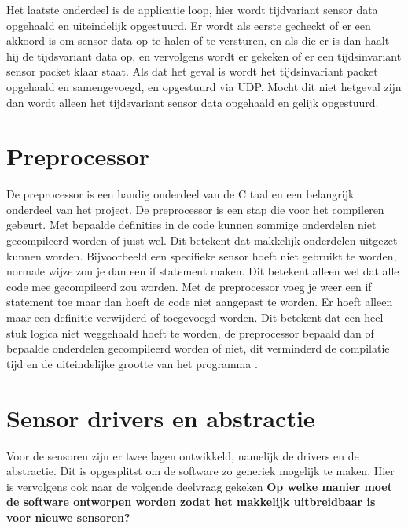 \noindent Het laatste onderdeel is de applicatie loop, hier wordt tijdvariant sensor data opgehaald en uiteindelijk opgestuurd. Er wordt als eerste gecheckt of er een akkoord is om sensor data op te halen of te versturen, en als die er is dan haalt hij de tijdsvariant data op, en vervolgens wordt er gekeken of er een tijdsinvariant sensor packet klaar staat. Als dat het geval is wordt het tijdsinvariant packet opgehaald en samengevoegd, en opgestuurd via UDP. Mocht dit niet hetgeval zijn dan wordt alleen het tijdsvariant sensor data opgehaald en gelijk opgestuurd. \newline

\section{Preprocessor} \label{sec:preprocessor}
De preprocessor is een handig onderdeel van de C taal en een belangrijk onderdeel van het project. De preprocessor is een stap die voor het compileren gebeurt. Met bepaalde definities in de code kunnen sommige onderdelen niet gecompileerd worden of juist wel. Dit betekent dat makkelijk onderdelen uitgezet kunnen worden. Bijvoorbeeld een specifieke sensor hoeft niet gebruikt te worden, normale wijze zou je dan een if statement maken. Dit betekent alleen wel dat alle code mee gecompileerd zou worden. Met de preprocessor voeg je weer een if statement toe maar dan hoeft de code niet aangepast te worden. Er hoeft alleen maar een definitie verwijderd of toegevoegd worden. Dit betekent dat een heel stuk logica niet weggehaald hoeft te worden, de preprocessor bepaald dan of bepaalde onderdelen gecompileerd worden of niet, dit verminderd de compilatie tijd en de uiteindelijke grootte van het programma \autocite{preprocessor}. 

\section{Sensor drivers en abstractie}
Voor de sensoren zijn er twee lagen ontwikkeld, namelijk de drivers en de abstractie. Dit is opgesplitst om de software zo generiek mogelijk te maken. Hier is vervolgens ook naar de volgende deelvraag gekeken \textbf{Op welke manier moet de software ontworpen worden zodat het makkelijk uitbreidbaar is voor nieuwe sensoren?} \newline 

